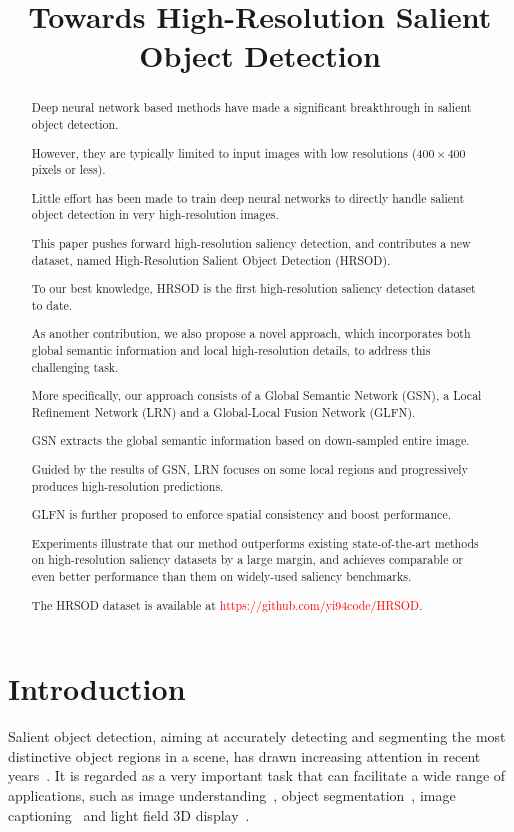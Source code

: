 \title{Towards High-Resolution Salient Object Detection}

\begin{abstract}
Deep neural network based methods have made a significant breakthrough in salient object detection.

However, they are typically limited to input images with low resolutions ($400\times400$ pixels or less).

Little effort has been made to train deep neural networks to directly handle salient object detection in very high-resolution images.

This paper pushes forward high-resolution saliency detection, and contributes a new dataset, named High-Resolution Salient Object Detection (HRSOD).

To our best knowledge, HRSOD is the first high-resolution saliency detection dataset to date.

As another contribution, we also propose a novel approach, which incorporates both global semantic information and local high-resolution details, to address this challenging task.

More specifically, our approach consists of a Global Semantic Network (GSN), a Local Refinement Network (LRN) and a Global-Local Fusion Network (GLFN).

GSN extracts the global semantic information based on down-sampled entire image.

Guided by the results of GSN, LRN focuses on some local regions and progressively produces high-resolution predictions.

GLFN is further proposed to enforce spatial consistency and boost performance.

Experiments illustrate that our method outperforms existing state-of-the-art methods on high-resolution saliency datasets by a large margin, and achieves comparable or even better performance than them on widely-used saliency benchmarks.

The HRSOD dataset is available at \textcolor{red}{https://github.com/yi94code/HRSOD}.
\end{abstract}

\section{Introduction}
Salient object detection, aiming at accurately detecting and segmenting the most distinctive object regions in a scene, has drawn increasing attention in recent years~\cite{fan2018salient,zhang2019salient,zhang2018hyperfusion,zhang2018agile,zhang2018non}. It is regarded as a very important task that can facilitate a wide range of applications, such as image understanding~\cite{lai2016saliency,zhu2015unsupervised,zhang2015saliency}, object segmentation~\cite{joon2017exploiting}, image captioning~\cite{fang2015captions,das2017human,xu2015show} and light field 3D display~\cite{wang2018salience}.

